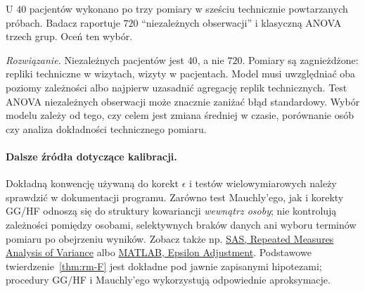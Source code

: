 \begin{zadanie}
U $40$ pacjentów wykonano po trzy pomiary w sześciu technicznie powtarzanych próbach. Badacz raportuje $720$ ``niezależnych obserwacji'' i klasyczną ANOVA trzech grup. Oceń ten wybór.\par
\emph{Rozwiązanie.} Niezależnych pacjentów jest $40$, a nie $720$. Pomiary są zagnieżdżone: repliki techniczne w wizytach, wizyty w pacjentach. Model musi uwzględniać oba poziomy zależności albo najpierw uzasadnić agregację replik technicznych. Test ANOVA niezależnych obserwacji może znacznie zaniżać błąd standardowy. Wybór modelu zależy od tego, czy celem jest zmiana średniej w czasie, porównanie osób czy analiza dokładności technicznego pomiaru.
\end{zadanie}

\paragraph{Dalsze źródła dotyczące kalibracji.}
Dokładną konwencję używaną do korekt $\epsilon$ i testów wielowymiarowych należy sprawdzić w dokumentacji programu. Zarówno test Mauchly'ego, jak i korekty GG/HF odnoszą się do struktury kowariancji \emph{wewnątrz osoby}; nie kontrolują zależności pomiędzy osobami, selektywnych braków danych ani wyboru terminów pomiaru po obejrzeniu wyników. Zobacz także np. \href{https://support.sas.com/documentation/cdl/en/statug/68162/HTML/default/statug_glm_details46.htm}{SAS, Repeated Measures Analysis of Variance} albo \href{https://www.mathworks.com/help/stats/repeatedmeasuresmodel.epsilon.html}{MATLAB, Epsilon Adjustment}. Podstawowe twierdzenie~\ref{thm:rm-F} jest dokładne pod jawnie zapisanymi hipotezami; procedury GG/HF i Mauchly'ego wykorzystują odpowiednie aproksymacje.


